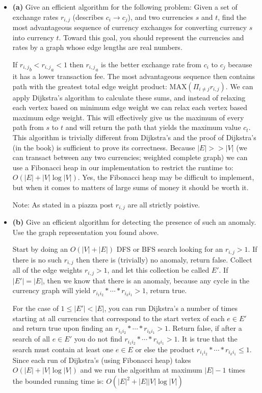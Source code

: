\documentclass[11pt]{article}
\begin{document}
\begin{itemize}
\item[] {\bf (a)} Give an efficient algorithm for the following problem: Given a set of exchange rates $r_{i,j}$ (describes $c_i\rightarrow c_j$), and two currencies $s$ and $t$, find the most advantageous sequence of currency exchanges for converting currency $s$ into currency $t$. Toward this goal, you should represent the currencies and rates by a graph whose edge lengths are real numbers.

If ${r_{i,j}}_b < {r_{i,j}}_a < 1$ then ${r_{i,j}}_a$ is the better exchange rate from $c_i$ to $c_j$ because it has a lower transaction fee. The most advantageous sequence then contains path with the greatest total edge weight product: $\mbox{MAX}(\Pi_{i\not= j}{r_{i,j}})$.  We can apply Dijkstra's algorithm to calculate these sums, and instead of relaxing each vertex based on minimum edge weight we can relax each vertex based maximum edge weight. This will effectively give us the maximum of every path from $s$ to $t$ and will return the path that yields the maximum value $c_t$. This algorithm is trivially different from Dijkstra's and the proof of Dijkstra's (in the book) is sufficient to prove its correctness. Because $|E| >> |V|$ (we can transact between any two currencies; weighted complete graph) we can use a Fibonacci heap in our implementation to restrict the runtime to: $O(|E| + |V|\log|V|)$. Yes, the Fibonacci heap may be difficult to implement, but when it comes to matters of large sums of money it should be worth it.

Note: As stated in a piazza post $r_{i,j}$ are all strictly poistive. 

\item[] {\bf (b)} Give an efficient algorithm for detecting the presence of such an anomaly. Use the graph representation you found above. 

Start by doing an $O(|V|+|E|)$  DFS or BFS search looking for an $r_{i,j} > 1$. If there is no such $r_{i,j}$ then there is (trivially) no anomaly, return false. Collect all of the edge weights $r_{i,j} > 1$, and let this collection be called $E'$. If $|E'| = |E|$, then we know that there is an anomaly, because any cycle in the currency graph will yield $r_{i_{1}i_{2}}*\cdots*r_{i_{k}i_{1}}>1$, return true.

For the case of $1\leq|E'|<|E|$, you can run Dijkstra's a number of times starting at all currencies that correspond to the start vertex of each $e\in E'$ and return true upon finding an $r_{i_{1}i_{2}}*\cdots*r_{i_{k}i_{1}}>1$. Return false, if after a search of all $e \in E'$ you do not find $r_{i_{1}i_{2}}*\cdots*r_{i_{k}i_{1}}>1$. It is true that the search must contain at least one $e\in E$ or else the product $r_{i_{1}i_{2}}*\cdots*r_{i_{k}i_{1}}\leq1$. Since each run of Dijkstra's (using Fibonacci heap) takes $O(|E| + |V|\log|V|)$ and we run the algorithm at maximum $|E|-1$ times the bounded running time is: $O(|E|^2+|E||V|\log|V|)$
\end{itemize}
\label{pg:end-of-p3}
\end{document}

